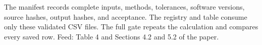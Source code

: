 The manifest records complete inputs, methods, tolerances, software
versions, source hashes, output hashes, and acceptance. The registry and
table consume only these validated CSV files. The full gate repeats the
calculation and compares every saved row. Feed: Table 4 and Sections
4.2 and 5.2 of the paper.

